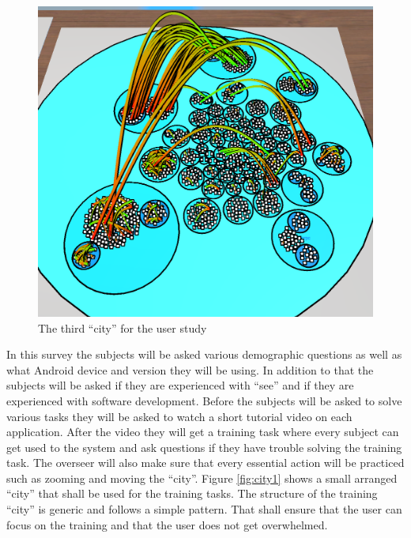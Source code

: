 \begin{figure}[htb]
  \centering
  \includegraphics[width=1\textwidth]{Evaluation/img/city_3.png}
  \caption{The third \enquote{\gls{city}} for the user study}\label{fig:city3}
\end{figure}
In this survey the subjects will be asked various demographic questions as well as what Android device and version they will be using.
In addition to that the subjects will be asked if they are experienced with \enquote{\gls{see}} and if they are experienced with software development.
Before the subjects will be asked to solve various tasks they will be asked to watch a short tutorial video on each application.
After the video they will get a training task where every subject can get used to the system and ask questions if they have trouble solving the training task. 
The overseer will also make sure that every essential action will be practiced such as zooming and moving the \enquote{\gls{city}}.
Figure \ref{fig:city1} shows a small arranged \enquote{\gls{city}} that shall be used for the training tasks.
The structure of the training \enquote{\gls{city}} is generic and follows a simple pattern. 
That shall ensure that the user can focus on the training and that the user does not get overwhelmed. 


